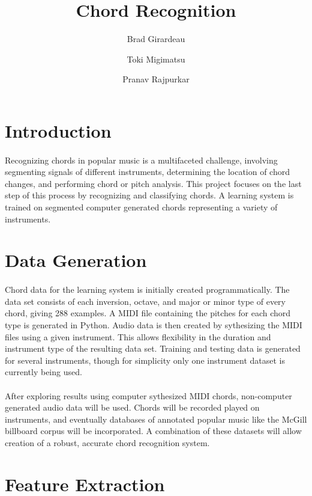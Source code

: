 \documentclass{article}
\title{Chord Recognition}
\author{Brad Girardeau
\and      Toki Migimatsu
\and      Pranav Rajpurkar}
\begin{document}
\maketitle

\section{Introduction}
\paragraph{}
Recognizing chords in popular music is a multifaceted challenge, involving segmenting signals of 
different instruments, determining the location of chord changes, and performing chord or pitch analysis. This
project focuses on the last step of this process by recognizing and classifying chords. A learning system is
trained on segmented computer generated chords representing a variety of instruments. 

\section{Data Generation}
\paragraph{}
Chord data for the learning system is initially created programmatically. The data set consists of each inversion, octave,
and major or minor type of every chord, giving 288 examples. A MIDI file containing the pitches for each chord type is generated 
in Python. Audio data is then created by sythesizing the MIDI files using a given instrument. This allows flexibility in the duration
and instrument type of the resulting data set. Training and testing data is generated for several instruments, though for simplicity only
one instrument dataset is currently being used.

\paragraph{}
After exploring results using computer sythesized MIDI chords, non-computer generated audio data will be used. Chords will be recorded played on instruments, and
eventually databases of annotated popular music like the McGill billboard corpus will be incorporated. A combination of these datasets will allow creation of a robust,
accurate chord recognition system.

\section{Feature Extraction}
\end{document}
